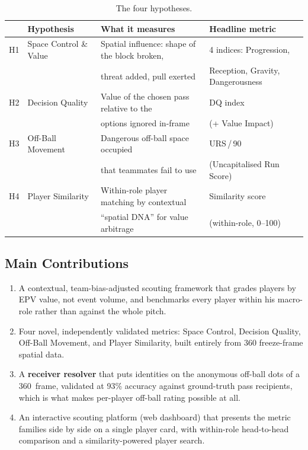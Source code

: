\documentclass[12pt,a4paper]{article}
\begin{document}
\begin{table}[H]
\centering
\caption{The four hypotheses.}\label{tab:hypotheses}
\small
\begin{tabularx}{\textwidth}{@{}lLLL@{}}
\toprule
& Hypothesis & What it measures & Headline metric \\
\midrule
H1 & Space Control \& Value &
    Spatial influence: shape of the block broken, & 4 indices: Progression, \\
    & & threat added, pull exerted & Reception, Gravity, Dangerousness \\ \midrule
H2 & Decision Quality &
    Value of the chosen pass relative to the & DQ index \\
    & & options ignored in-frame & (+ Value Impact) \\ \midrule
H3 & Off-Ball Movement &
    Dangerous off-ball space occupied & URS\,/\,90 \\
    & & that teammates fail to use & (Uncapitalised Run Score) \\ \midrule
H4 & Player Similarity &
    Within-role player matching by contextual & Similarity score \\
    & & ``spatial DNA'' for value arbitrage & (within-role, 0--100) \\
\bottomrule
\end{tabularx}
\end{table}

\subsection{Main Contributions}\label{sec:contributions}

\begin{enumerate}
    \item A contextual, team-bias-adjusted scouting framework that grades players by EPV value, not event volume, and benchmarks every player within his macro-role rather than against the whole pitch.
    \item Four novel, independently validated metrics: Space Control, Decision Quality, Off-Ball Movement, and Player Similarity, built entirely from 360 freeze-frame spatial data.
    \item A \textbf{receiver resolver} that puts identities on the anonymous off-ball dots of a 360~frame, validated at 93\% accuracy against ground-truth pass recipients, which is what makes per-player off-ball rating possible at all.
    \item An interactive scouting platform (web dashboard) that presents the metric families side by side on a single player card, with within-role head-to-head comparison and a similarity-powered player search.
\end{enumerate}
\end{document}
